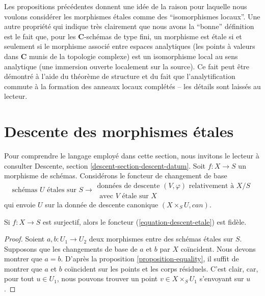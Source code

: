 \noindent
Les propositions précédentes donnent une idée de la raison pour laquelle nous voulons considérer
les morphismes \'etales comme des ``isomorphismes locaux''. Une autre propriété qui indique
très clairement que nous avons la ``bonne'' définition est le fait que,
pour les $\mathbf{C}$-schémas de type fini, un morphisme est \'etale si et seulement si
le morphisme associé entre espaces analytiques (les points à valeurs dans $\mathbf{C}$ munis
de la topologie complexe) est un isomorphisme local au sens analytique (une immersion
ouverte localement sur la source). Ce fait peut être démontré à l'aide du
théorème de structure et du fait que l'analytification commute à la
formation des anneaux locaux complétés -- les détails sont laissés au lecteur.








\section{Descente des morphismes \'etales}
\label{section-descending-etale}

\noindent
Pour comprendre le langage employé dans cette section, nous invitons
le lecteur à consulter
Descente, section \ref{descent-section-descent-datum}.
Soit $f : X \to S$ un morphisme de schémas. Considérons le
foncteur de changement de base
\begin{equation}
\label{equation-descent-etale}
\text{schémas }U\text{ \'etales sur }S \longrightarrow
\begin{matrix}
\text{données de descente }(V, \varphi)\text{ relativement à }X/S \\
\text{ avec }V\text{ \'etale sur }X
\end{matrix}
\end{equation}
qui envoie $U$ sur la donnée de descente canonique $(X \times_S U, can)$.

\begin{lemma}
\label{lemma-faithful}
Si $f : X \to S$ est surjectif, alors le foncteur
(\ref{equation-descent-etale}) est fidèle.
\end{lemma}

\begin{proof}
Soient $a, b : U_1 \to U_2$ deux morphismes entre des schémas \'etales sur $S$.
Supposons que les changements de base de $a$ et $b$ par $X$ coïncident.
Nous devons montrer que $a = b$.
D'après la proposition \ref{proposition-equality}, il suffit de
montrer que $a$ et $b$ coïncident sur les points et les corps résiduels.
C'est clair, car, pour tout $u \in U_1$, nous pouvons trouver un point
$v \in X \times_S U_1$ s'envoyant sur $u$.
\end{proof}

